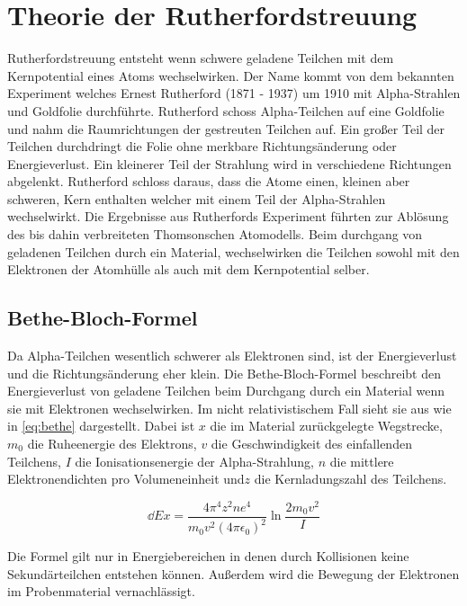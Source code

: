 \section{Theorie der Rutherfordstreuung}
\label{sec:theorie}

Rutherfordstreuung entsteht wenn schwere geladene Teilchen mit dem Kernpotential eines Atoms wechselwirken.
Der Name kommt von dem bekannten Experiment welches Ernest Rutherford (1871 - 1937)  um
1910 mit Alpha-Strahlen und Goldfolie durchführte. Rutherford schoss Alpha-Teilchen auf eine Goldfolie
und nahm die Raumrichtungen der gestreuten Teilchen auf. Ein großer Teil der Teilchen durchdringt
die Folie ohne merkbare Richtungsänderung oder Energieverlust. Ein kleinerer Teil der Strahlung wird
in verschiedene Richtungen abgelenkt. Rutherford schloss daraus, dass die Atome einen, kleinen
aber schweren, Kern enthalten welcher mit einem Teil der Alpha-Strahlen wechselwirkt.
Die Ergebnisse aus Rutherfords Experiment führten zur Ablösung des bis dahin verbreiteten
Thomsonschen Atomodells.
Beim durchgang von geladenen Teilchen durch ein Material, wechselwirken die Teilchen sowohl mit den
Elektronen der Atomhülle als auch mit dem Kernpotential selber.

\subsection{Bethe-Bloch-Formel}
\label{sub:bethe}

Da Alpha-Teilchen wesentlich schwerer als Elektronen sind,
ist der Energieverlust und die Richtungsänderung eher klein.
Die Bethe-Bloch-Formel beschreibt den Energieverlust von geladene Teilchen beim Durchgang durch ein
Material wenn sie mit Elektronen wechselwirken.
Im nicht relativistischem Fall sieht sie aus wie in \eqref{eq:bethe} dargestellt.
Dabei ist $x$ die im Material zurückgelegte Wegstrecke, $m_0$ die Ruheenergie des Elektrons,
$v$ die Geschwindigkeit des einfallenden Teilchens, $I$ die Ionisationsenergie der Alpha-Strahlung,
$n$ die mittlere Elektronendichten pro Volumeneinheit und$z$ die Kernladungszahl des Teilchens.

\begin{equation}
  \label{eq:bethe}
  \dd{E}{x} = \frac{4 \pi^4 z^2 n e^4}{m_0 v^2 (4 \pi \epsilon_0)^2} \ln \frac{2 m_0 v^2}{I}
\end{equation}

Die Formel gilt nur in Energiebereichen in denen durch Kollisionen keine Sekundärteilchen entstehen können.
Außerdem wird die Bewegung der Elektronen im Probenmaterial vernachlässigt.
